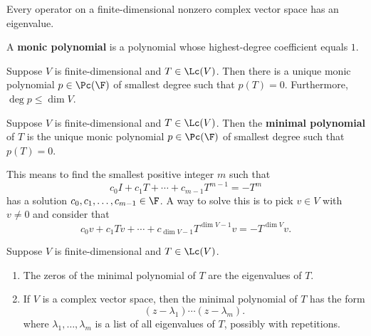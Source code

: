 \documentclass{extarticle}
\begin{document}
\begin{thm}
    Every operator on a finite-dimensional nonzero complex vector space has an eigenvalue. 
\end{thm}

\begin{definition}
    A \textbf{monic polynomial} is a polynomial whose highest-degree coefficient 
    equals \(1\). 
\end{definition}

\begin{thm}
    Suppose \(V\) is finite-dimensional and \(T \in \Lc(V)\). Then there is a unique 
    monic polynomial \(p \in \Pc(\F)\) of smallest degree such that \(p(T) = 0\). 
    Furthermore, \(\deg p \leq \dim V\). 
\end{thm}

\begin{definition}
    Suppose \(V\) is finite-dimensional and \(T \in \Lc(V)\). Then the \textbf{minimal polynomial} of \(T\)
    is the unique monic polynomial \(p \in \Pc(\F)\) of smallest degree such that \(p(T) = 0\).
\end{definition}

\begin{remark}
    This means to find the smallest positive integer \(m\) such that 
    \[c_0 I + c_1 T + \cdots + c_{m-1}T^{m-1} = -T^{m}\]
    has a solution \(c_0, c_1, \ldots, c_{m-1} \in \F\). A way to solve this is to pick \(v \in V\) 
    with \(v \neq 0\) and consider that 
    \[c_0 v + c_1 Tv + \cdots + c_{\dim V - 1} T^{\dim V - 1} v = - T^{\dim V}v.\]
\end{remark}

\begin{thm}
    Suppose \(V\) is finite-dimensional and \(T \in \Lc(V)\). 
    \begin{enumerate}[label=(\alph*)]
        \item The zeros of the minimal polynomial of \(T\) are the eigenvalues of \(T\). 
        \item If \(V\) is a complex vector space, then the minimal polynomial of \(T\) has the 
        form 
        \[(z - \lambda_1) \cdots (z-\lambda_m).\]
        where \(\lambda_1, \ldots, \lambda_m\) is a list of all eigenvalues of \(T\), possibly with repetitions.
    \end{enumerate}
\end{thm}
\end{document}
